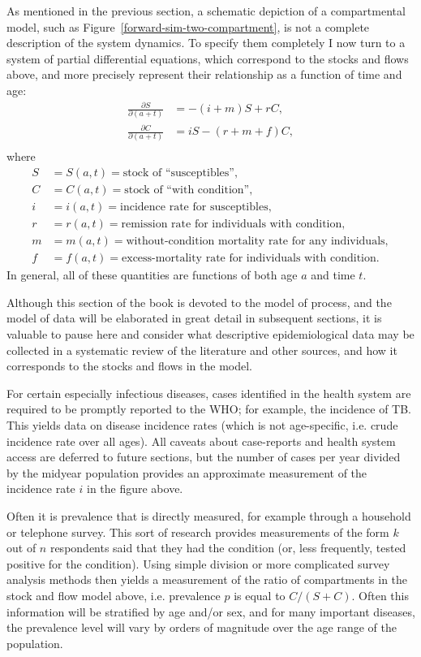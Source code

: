 As mentioned in the previous section, a schematic depiction of a
compartmental model, such as Figure~\ref{forward-sim-two-compartment},
is not a complete description of the system dynamics.  To specify them
completely I now turn to a system of partial differential equations,
which correspond to the stocks and flows above, and more precisely
represent their relationship as a function of time and age:
\begin{align*}
\frac{\partial S}{\partial (a+t)} &= -(i + m)S + rC,\\
\frac{\partial C}{\partial (a+t)} &= iS - (r + m + f)C,\\
\end{align*}
where
\begin{align*}
S &= S(a,t) = \text{stock of ``susceptibles''},\\
C &= C(a,t) = \text{stock of ``with condition''},\\[.1in]
i &= i(a,t) = \text{incidence rate for susceptibles},\\
r &= r(a,t) = \text{remission rate for individuals with condition},\\
m &= m(a,t) = \text{without-condition mortality rate for any individuals},\\
f &= f(a,t) = \text{excess-mortality rate for individuals with
condition}.
\end{align*}
In general, all of these quantities are functions of both age $a$ and
time $t$.

Although this section of the book is devoted to the model of process,
and the model of data will be elaborated in great detail in subsequent
sections, it is valuable to pause here and consider what descriptive
epidemiological data may be collected in a systematic review of the
literature and other sources, and how it corresponds to the stocks and
flows in the model.

For certain especially infectious diseases, cases identified in the
health system are required to be promptly reported to the WHO; for
example, the incidence of TB.  This yields data on disease incidence
rates (which is not age-specific, i.e. crude incidence rate over all
ages).  All caveats about case-reports and health system access are
deferred to future sections, but the number of cases per year divided
by the midyear population provides an approximate measurement of the
incidence rate $i$ in the figure above.

Often it is prevalence that is directly measured, for example through
a household or telephone survey.  This sort of research provides
measurements of the form $k$ out of $n$ respondents said that they had
the condition (or, less frequently, tested positive for the
condition). Using simple division or more complicated survey analysis
methods then yields a measurement of the ratio of compartments in the
stock and flow model above, i.e. prevalence $p$ is equal to $C/(S+C)$.
Often this information will be stratified by age and/or sex, and for
many important diseases, the prevalence level will vary by orders of
magnitude over the age range of the population.

